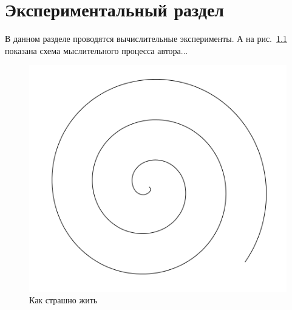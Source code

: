 \chapter{Экспериментальный раздел}
\label{cha:research}

В данном разделе проводятся вычислительные эксперименты.
А на рис.~\ref{fig:spire01} показана схема мыслительного процесса автора...

\begin{figure}
  \centering
  \includegraphics[width=\textwidth]{figures/pic01}
  \caption{Как страшно жить}
  \label{fig:spire01}
\end{figure}


